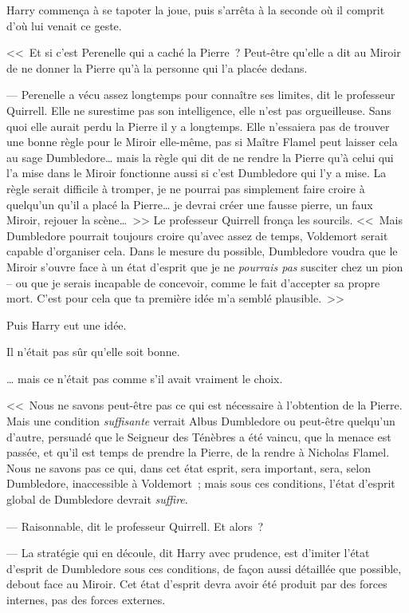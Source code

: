 Harry commença à se tapoter la joue, puis s'arrêta à la seconde où il comprit d'où lui venait ce geste.

<<~Et si c'est Perenelle qui a caché la Pierre~? Peut-être qu'elle a dit au Miroir de ne donner la Pierre qu'à la personne qui l'a placée dedans.

--- Perenelle a vécu assez longtemps pour connaître ses limites, dit le professeur Quirrell. Elle ne surestime pas son intelligence, elle n'est pas orgueilleuse. Sans quoi elle aurait perdu la Pierre il y a longtemps. Elle n'essaiera pas de trouver une bonne règle pour le Miroir elle-même, pas si Maître Flamel peut laisser cela au sage Dumbledore… mais la règle qui dit de ne rendre la Pierre qu'à celui qui l'a mise dans le Miroir fonctionne aussi si c'est Dumbledore qui l'y a mise. La règle serait difficile à tromper, je ne pourrai pas simplement faire croire à quelqu'un qu'il a placé la Pierre… je devrai créer une fausse pierre, un faux Miroir, rejouer la scène…~>> Le professeur Quirrell fronça les sourcils. <<~Mais Dumbledore pourrait toujours croire qu'avec assez de temps, Voldemort serait capable d'organiser cela. Dans le mesure du possible, Dumbledore voudra que le Miroir s'ouvre face à un état d'esprit que je ne \emph{pourrais pas} susciter chez un pion -- ou que je serais incapable de concevoir, comme le fait d'accepter sa propre mort. C'est pour cela que ta première idée m'a semblé plausible.~>>

Puis Harry eut une idée.

Il n'était pas sûr qu'elle soit bonne.

… mais ce n'était pas comme s'il avait vraiment le choix.

<<~Nous ne savons peut-être pas ce qui est nécessaire à l'obtention de la Pierre. Mais une condition \emph{suffisante} verrait Albus Dumbledore ou peut-être quelqu'un d'autre, persuadé que le Seigneur des Ténèbres a été vaincu, que la menace est passée, et qu'il est temps de prendre la Pierre, de la rendre à Nicholas Flamel. Nous ne savons pas ce qui, dans cet état esprit, sera important, sera, selon Dumbledore, inaccessible à Voldemort~; mais sous ces conditions, l'état d'esprit global de Dumbledore devrait \emph{suffire}.

--- Raisonnable, dit le professeur Quirrell. Et alors~?

--- La stratégie qui en découle, dit Harry avec prudence, est d'imiter l'état d'esprit de Dumbledore sous ces conditions, de façon aussi détaillée que possible, debout face au Miroir. Cet état d'esprit devra avoir été produit par des forces internes, pas des forces externes.

